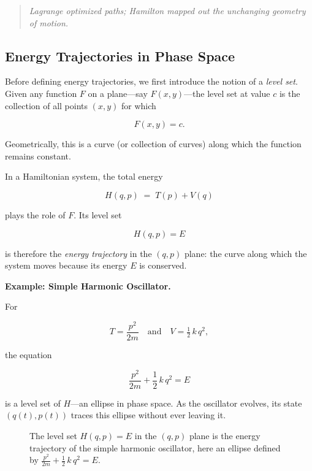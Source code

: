 \begin{quote}
    \textit{Lagrange optimized paths; Hamilton mapped out the unchanging geometry of motion.}
\end{quote}






\subsection{Energy Trajectories in Phase Space}

Before defining energy trajectories, we first introduce the notion of a \emph{level set}.  Given any function \(F\) on a plane—say \(F(x,y)\)—the level set at value \(c\) is the collection of all points \((x,y)\) for which

\[
F(x,y) = c.
\]

Geometrically, this is a curve (or collection of curves) along which the function remains constant.

In a Hamiltonian system, the total energy

\[
H(q,p) \;=\; T(p) + V(q)
\]

plays the role of \(F\).  Its level set

\[
H(q,p) = E
\]

is therefore the \emph{energy trajectory} in the \((q,p)\) plane: the curve along which the system moves because its energy \(E\) is conserved.

\textbf{Example: Simple Harmonic Oscillator.}  

For

\[
T = \frac{p^2}{2m}
\quad\text{and}\quad
V = \tfrac12\,k\,q^2,
\]

the equation

\[
\frac{p^2}{2m} + \frac12\,k\,q^2 = E
\]

is a level set of \(H\)—an ellipse in phase space.  As the oscillator evolves, its state \((q(t),p(t))\) traces this ellipse without ever leaving it.

\begin{figure}[H]
\centering
{}
\caption{The level set \(H(q,p)=E\) in the \((q,p)\) plane is the energy trajectory of the simple harmonic oscillator, here an ellipse defined by \(\tfrac{p^2}{2m} + \tfrac12\,k\,q^2 = E\).}
\end{figure}

